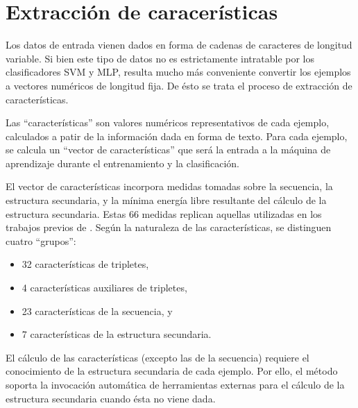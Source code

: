 \section{Extracción de caracerísticas}
Los datos de entrada vienen dados en forma de cadenas de caracteres de
longitud variable. Si bien este tipo de datos no es estrictamente
intratable por los clasificadores SVM y MLP, resulta mucho más
conveniente convertir los ejemplos a vectores numéricos de longitud
fija. De ésto se trata el proceso de extracción de características.

Las ``características'' son valores numéricos representativos de cada
ejemplo, calculados a patir de la información dada en forma de texto.
Para cada ejemplo, se calcula un ``vector de características'' que
será la entrada a la máquina de aprendizaje durante el entrenamiento y
la clasificación.

El vector de características incorpora medidas tomadas sobre la
secuencia, la estructura secundaria, y la mínima energía libre
resultante del cálculo de la estructura secundaria.  Estas 66 medidas
replican aquellas utilizadas en los trabajos previos de \cite{xue, ng,
  batuwita}.  Según la naturaleza de las características, se
distinguen cuatro ``grupos'':

\begin{itemize}
\item 32 características de tripletes,
\item 4 características auxiliares de tripletes,
\item 23 características de la secuencia, y
\item 7 características de la estructura secundaria.
\end{itemize}
El cálculo de las características (excepto las de la secuencia)
requiere el conocimiento de la estructura secundaria de cada
ejemplo. Por ello, el método soporta la invocación automática de
herramientas externas para el cálculo de la estructura secundaria
cuando ésta no viene dada.
